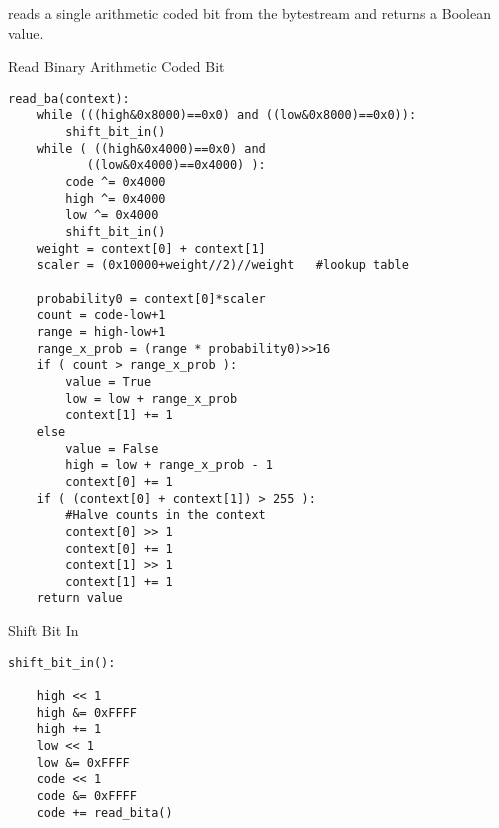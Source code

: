 \begin{comment}

This function is fundamental to all the arithmetic decoding functions.
It consists of three stages:

1.  Determine the binary output value VALUE as per Section 

2.  Modify the decoder state as per Section 

3.  Update the context statistics by invoking update( CONTEXT , VALUE )
as per Section 
\end{comment}



reads a single arithmetic coded bit from the bytestream and returns a
Boolean value.

Read Binary Arithmetic Coded Bit
\begin{verbatim}
read_ba(context):
    while (((high&0x8000)==0x0) and ((low&0x8000)==0x0)):
        shift_bit_in()
    while ( ((high&0x4000)==0x0) and
           ((low&0x4000)==0x4000) ):
        code ^= 0x4000
        high ^= 0x4000
        low ^= 0x4000
        shift_bit_in()
    weight = context[0] + context[1]
    scaler = (0x10000+weight//2)//weight   #lookup table

    probability0 = context[0]*scaler
    count = code-low+1
    range = high-low+1
    range_x_prob = (range * probability0)>>16
    if ( count > range_x_prob ):
        value = True
        low = low + range_x_prob
        context[1] += 1
    else
        value = False
        high = low + range_x_prob - 1
        context[0] += 1
    if ( (context[0] + context[1]) > 255 ):
        #Halve counts in the context
        context[0] >> 1
        context[0] += 1
        context[1] >> 1
        context[1] += 1
    return value
\end{verbatim}

Shift Bit In
\begin{verbatim}
shift_bit_in():

    high << 1
    high &= 0xFFFF
    high += 1
    low << 1
    low &= 0xFFFF
    code << 1
    code &= 0xFFFF
    code += read_bita()
\end{verbatim}
